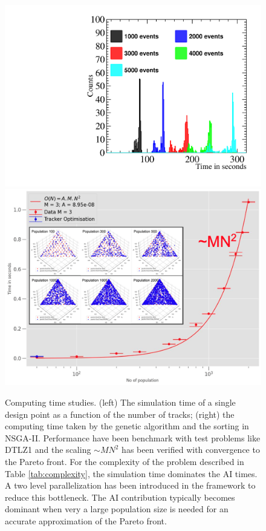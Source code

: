 \begin{figure}[!]
    \centering
    \includegraphics[scale = 0.33]{figs/TimeHistROOT.pdf}
    \includegraphics[scale = 0.18]{figs/AI_time_study.png}
    \caption{Computing time studies. (left) The simulation time of a single design point as a function of the number of tracks; (right) the computing time taken by the genetic algorithm and the sorting in NSGA-II. Performance have been benchmark with test problems like DTLZ1 \cite{ishibuchi2016performance} and the scaling $\sim MN^{2}$ has been verified with convergence to the Pareto front. For the complexity of the problem described in Table \ref{tab:complexity}, the simulation time dominates the AI times. A two level parallelization has been introduced in the framework to reduce this bottleneck.  
    The AI contribution typically becomes dominant when very a large population size is needed for an accurate approximation of the Pareto front. 
}
    \label{fig:computing-times}
\end{figure}

